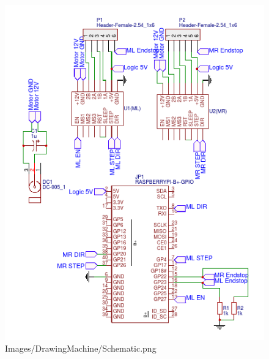 \begin{figure}[H]
\includegraphics[width=\textwidth]{Images/DrawingMachine/Schematic.png}
\caption{Images/DrawingMachine/Schematic.png}
\label{fig:Images/DrawingMachine/Schematic.png}
\end{figure}
